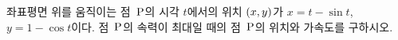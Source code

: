 좌표평면 위를 움직이는 점~$\mathrm{P}$의 시각 $t$에서의 위치 $(x{,}\mkern3mu\mathopen{}y)$가 $x=t-\sin t$, $y=1-\cos t$이다. 점~$\mathrm{P}$의 속력이 최대일 때의 점~$\mathrm{P}$의 위치와 가속도를 구하시오. 
